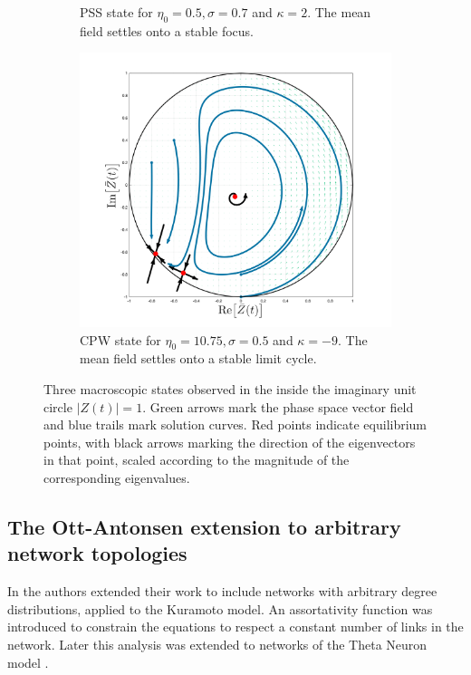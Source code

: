 \begin{figure}[H]
\begin{subfigure}[b]{0.32\linewidth}
   \caption{PSS state for $\eta_0 = 0.5, \sigma = 0.7$ and $\kappa= 2$. The mean field settles onto a stable focus.}
   \label{fig:MFRPSS}
\end{subfigure} \hfill
\begin{subfigure}[b]{0.32\linewidth}
   \centering
  \includegraphics[width=\linewidth, trim={2cm 1cm 2cm 1.5cm },clip]{../Figures/PhaseSpace/MFRCPW.png}
   \caption{CPW state for $\eta_0 = 10.75, \sigma = 0.5$ and $\kappa= -9$. The mean field settles onto a stable limit cycle.}
   \label{fig:MFRCPW}
\end{subfigure}
   \caption{Three macroscopic states observed in the \MFR inside the imaginary unit circle $|Z(t)| = 1$. Green arrows mark the phase space vector field and blue trails mark solution curves. Red points indicate equilibrium points, with black arrows marking the direction of the eigenvectors in that point, scaled according to the magnitude of the corresponding eigenvalues.}
   \label{fig:macroscopicstatesfixeddegree}
\end{figure}



\subsection{The Ott-Antonsen extension to arbitrary network topologies}
In \cite{Restrepo2014} the authors extended their work to include networks with arbitrary degree distributions, applied to the Kuramoto model. An assortativity function was introduced to constrain the equations to respect a constant number of links in the network. Later this analysis was extended to networks of the Theta Neuron model \cite{OttAntonsen2017}. 

